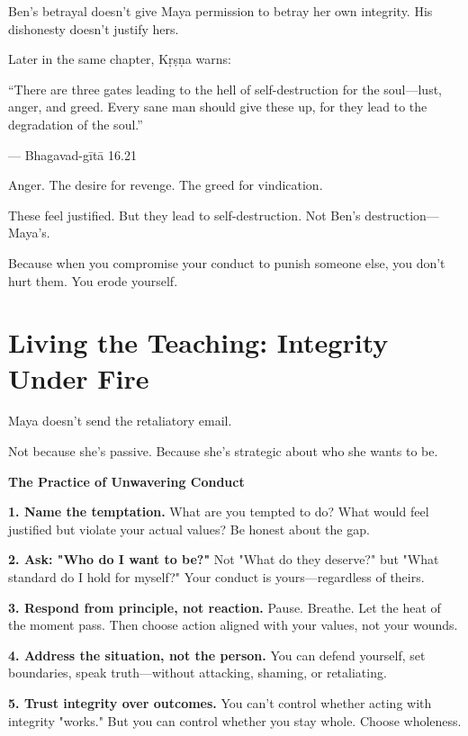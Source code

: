 \documentclass[11pt,twoside]{book}
\begin{document}
Ben's betrayal doesn't give Maya permission to betray her own integrity. His dishonesty doesn't justify hers.

Later in the same chapter, Kṛṣṇa warns:

\begin{pullquote}
``There are three gates leading to the hell of self-destruction for the soul—lust, anger, and greed. Every sane man should give these up, for they lead to the degradation of the soul.''

--- Bhagavad-gītā 16.21
\end{pullquote}

Anger. The desire for revenge. The greed for vindication.

These feel justified. But they lead to self-destruction. Not Ben's destruction—Maya's.

Because when you compromise your conduct to punish someone else, you don't hurt them. You erode yourself.

\section*{Living the Teaching: Integrity Under Fire}

Maya doesn't send the retaliatory email.

Not because she's passive. Because she's strategic about who she wants to be.

\begin{practicebox}
\textbf{The Practice of Unwavering Conduct}

\textbf{1. Name the temptation.} What are you tempted to do? What would feel justified but violate your actual values? Be honest about the gap.

\textbf{2. Ask: "Who do I want to be?"} Not "What do they deserve?" but "What standard do I hold for myself?" Your conduct is yours—regardless of theirs.

\textbf{3. Respond from principle, not reaction.} Pause. Breathe. Let the heat of the moment pass. Then choose action aligned with your values, not your wounds.

\textbf{4. Address the situation, not the person.} You can defend yourself, set boundaries, speak truth—without attacking, shaming, or retaliating.

\textbf{5. Trust integrity over outcomes.} You can't control whether acting with integrity "works." But you can control whether you stay whole. Choose wholeness.
\end{practicebox}
\end{document}
